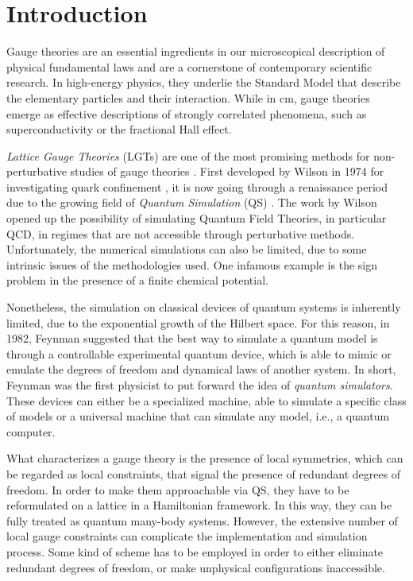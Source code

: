 \newpage

\chapter*{Introduction}
\label{chap:introduction}

Gauge theories are an essential ingredients in our microscopical description of physical fundamental laws and are a cornerstone of contemporary scientific research.
In high-energy physics, they underlie the Standard Model that describe the elementary particles and their interaction.
While in \ac{cm}, gauge theories emerge as effective descriptions of strongly correlated phenomena, such as superconductivity or the fractional Hall effect.

\emph{Lattice Gauge Theories} (LGTs) are one of the most promising methods for non-perturbative studies of gauge theories \cite{banuls2020simulating}.
First developed by Wilson in 1974 for investigating quark confinement \cite{wilson1974confinement}, it is now going through a renaissance period due to the growing field of \emph{Quantum Simulation} (QS) \cite{cirac2012goals}.
The work by Wilson opened up the possibility of simulating Quantum Field Theories, in particular QCD, in regimes that are not accessible through perturbative methods.
Unfortunately, the numerical simulations can also be limited, due to some intrinsic issues of the methodologies used.
One infamous example is the sign problem in the presence of a finite chemical potential.

Nonetheless, the simulation on classical devices of quantum systems is inherently limited, due to the exponential growth of the Hilbert space.
For this reason, in 1982, Feynman \cite{feynman1982simulation} suggested that the best way to simulate a quantum model is through a controllable experimental quantum device, which is able to mimic or emulate the degrees of freedom and dynamical laws of another system.
In short, Feynman was the first physicist to put forward the idea of \emph{quantum simulators}.
These devices can either be a specialized machine, able to simulate a specific class of models or a universal machine that can simulate any model, i.e., a quantum computer.

\medskip

What characterizes a gauge theory is the presence of local symmetries, which can be regarded as local constraints, that signal the presence of redundant degrees of freedom.
In order to make them approachable via QS, they have to be reformulated on a lattice in a Hamiltonian framework.
In this way, they can be fully treated as quantum many-body systems.
However, the extensive number of local gauge constraints can complicate the implementation and simulation process.
Some kind of scheme has to be employed in order to either eliminate redundant degrees of freedom, or make unphysical configurations inaccessible.

